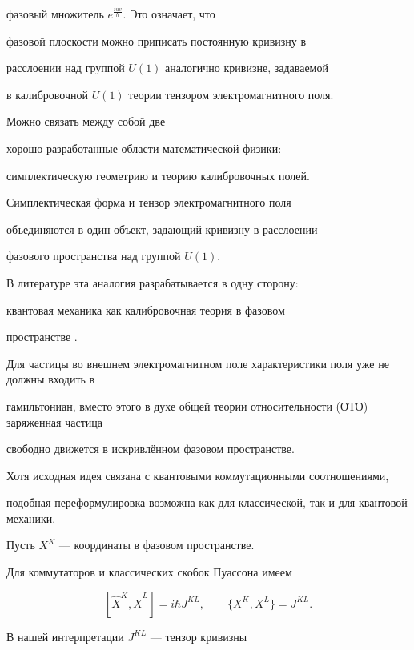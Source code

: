   фазовый множитель $e^{\frac{iuv}\hbar}$. Это означает, что

  фазовой плоскости можно приписать постоянную кривизну в

  расслоении над группой $U(1)$ аналогично кривизне, задаваемой

  в калибровочной $U(1)$ теории тензором электромагнитного поля.



  Можно связать между собой две

  хорошо разработанные области математической физики:

  симплектическую геометрию и теорию калибровочных полей.

  Симплектическая форма и тензор электромагнитного поля

  объединяются в один объект, задающий кривизну в расслоении

  фазового пространства над группой $U(1)$.

  В литературе эта аналогия разрабатывается в одну сторону:

  квантовая механика как калибровочная теория в фазовом

  пространстве \cite{ivanovmg:bib:deGosson}.



Для частицы во внешнем электромагнитном поле характеристики поля уже не должны входить в

 гамильтониан, вместо этого в духе общей теории относительности (ОТО) заряженная частица

 свободно движется в искривлённом фазовом пространстве.



  Хотя исходная идея связана с квантовыми коммутационными соотношениями,

  подобная переформулировка возможна как для классической, так и для квантовой механики.






  Пусть $X^K$ --- координаты в фазовом пространстве.

  Для коммутаторов и классических скобок Пуассона имеем

$$

  [\hat X^K,\hat X^L]=i\hbar J^{KL},\qquad

  \{X^K,X^L\}=J^{KL}.

$$

  В нашей интерпретации $J^{KL}$ --- тензор кривизны


